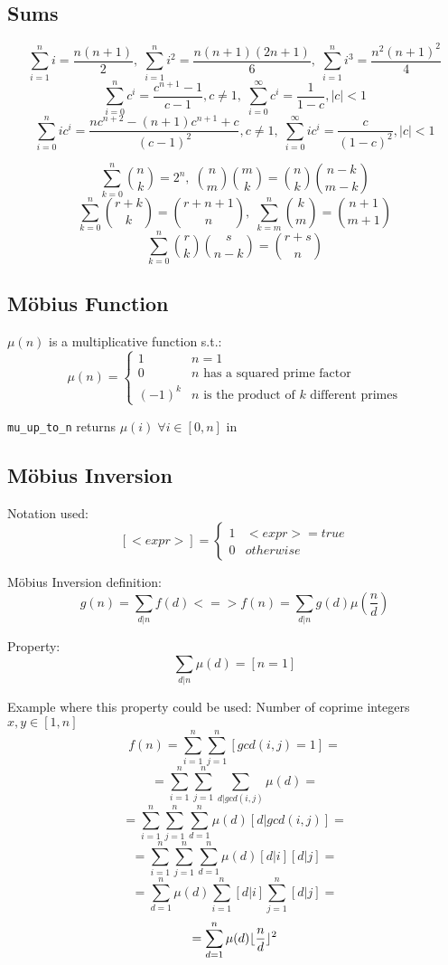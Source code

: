 \subsection{Sums}
\[\sum_{i=1}^{n}{i} = \frac{n(n+1)}{2},\; \sum_{i=1}^{n}{i^2} = \frac{n(n+1)(2n+1)}{6},\; \sum_{i=1}^{n}{i^3} = \frac{n^2(n+1)^2}{4}\]
\[\sum_{i=0}^{n}{c^i} = \frac{c^{n+1}-1}{c-1}, c \neq 1,\; \sum_{i=0}^{\infty}{c^i} = \frac{1}{1-c}, |c| < 1\]
\[\sum_{i=0}^{n}{ic^i} = \frac{nc^{n+2}-(n+1)c^{n+1}+c}{(c-1)^2}, c \neq 1,\; \sum_{i=0}^{\infty}{ic^i} = \frac{c}{(1-c)^2}, |c| < 1\]

\[\sum_{k=0}^{n}{\binom{n}{k}} = 2^n,\; \binom{n}{m}\binom{m}{k} = \binom{n}{k}\binom{n-k}{m-k}\]
\[\sum_{k=0}^{n}{\binom{r+k}{k}} = \binom{r+n+1}{n},\; \sum_{k=m}^{n}{\binom{k}{m}} = \binom{n+1}{m+1}\]
\[\sum_{k=0}^{n}{\binom{r}{k}\binom{s}{n-k} = \binom{r+s}{n}}\]


\subsection{Möbius Function}
$\mu(n)$ is a multiplicative function s.t.: \\
\[\mu(n) =
	\begin{cases}
		1 & n = 1 \\
		0 & \textrm{$n$ has a squared prime factor} \\
		(-1)^k & \textrm{$n$ is the product of $k$ different primes}
	\end{cases}
\]

\verb|mu_up_to_n| returns $\mu(i) \; \forall i \in [0, n]$ in 


\subsection{Möbius Inversion}
Notation used:
\[[<expr>] =
	\begin{cases}
		1 & <expr> = true \\
		0 & otherwise
	\end{cases}
\]

Möbius Inversion definition:
\[g(n) = \sum_{d|n}f(d) <=> f(n) = \sum_{d|n}g(d)\mu(\frac{n}{d})\]

Property:
\[\sum_{d|n}\mu(d) = [n = 1]\]

Example where this property could be used:
Number of coprime integers $x, y \in [1, n]$
\[f(n) = \sum_{i=1}^{n}\sum_{j=1}^{n}[gcd(i,j) = 1] =\]
\[= \sum_{i=1}^{n}\sum_{j=1}^{n}\sum_{d|gcd(i,j)}\mu(d) =\]
\[= \sum_{i=1}^{n}\sum_{j=1}^{n}\sum_{d=1}^{n}\mu(d)[d | gcd(i, j)] =\]
\[= \sum_{i=1}^{n}\sum_{j=1}^{n}\sum_{d=1}^{n}\mu(d)[d | i][d | j] =\]
\[= \sum_{d=1}^{n}\mu(d)\sum_{i=1}^{n}[d | i]\sum_{j=1}^{n}[d | j] =\]
\[= \sum_{d=1}^{n}\mu(d)\lfloor\frac{n}{d}\rfloor^2\]


